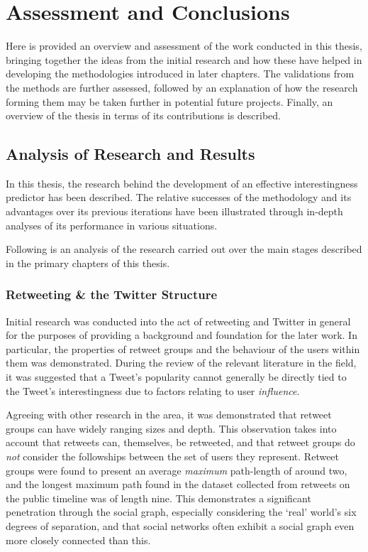 \chapter{Assessment and Conclusions}
Here is provided an overview and assessment of the work conducted in this thesis, bringing together the ideas from the initial research and how these have helped in developing the methodologies introduced in later chapters. The validations from the methods are further assessed, followed by an explanation of how the research forming them may be taken further in potential future projects. Finally, an overview of the thesis in terms of its contributions is described.


\section{Analysis of Research and Results}
In this thesis, the research behind the development of an effective interestingness predictor has been described. The relative successes of the methodology and its advantages over its previous iterations have been illustrated through in-depth analyses of its performance in various situations.

Following is an analysis of the research carried out over the main stages described in the primary chapters of this thesis.

\subsection{Retweeting \& the Twitter Structure}
Initial research was conducted into the act of retweeting and Twitter in general for the purposes of providing a background and foundation for the later work. In particular, the properties of retweet groups and the behaviour of the users within them was demonstrated. During the review of the relevant literature in the field, it was suggested that a Tweet's popularity cannot generally be directly tied to the Tweet's interestingness due to factors relating to user \textit{influence}.

Agreeing with other research in the area, it was demonstrated that retweet groups can have widely ranging sizes and depth. This observation takes into account that retweets can, themselves, be retweeted, and that retweet groups do \textit{not} consider the followships between the set of users they represent. Retweet groups were found to present an average \textit{maximum} path-length of around two, and the longest maximum path found in the dataset collected from retweets on the public timeline was of length nine. This demonstrates a significant penetration through the social graph, especially considering the `real' world's six degrees of separation, and that social networks often exhibit a social graph even more closely connected than this.

